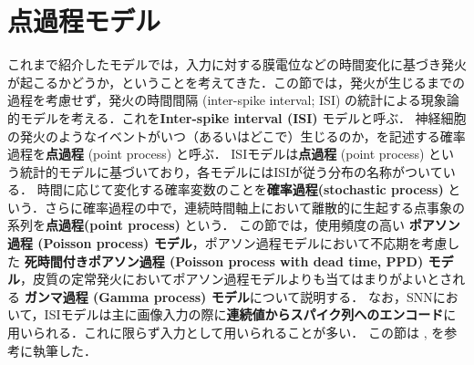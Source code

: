 \section{点過程モデル}
これまで紹介したモデルでは，入力に対する膜電位などの時間変化に基づき発火が起こるかどうか，ということを考えてきた．この節では，発火が生じるまでの過程を考慮せず，発火の時間間隔 (inter-spike interval; ISI) の統計による現象論的モデルを考える．これを\textbf{Inter-spike interval (ISI)} モデルと呼ぶ．
神経細胞の発火のようなイベントがいつ（あるいはどこで）生じるのか，を記述する確率過程を\textbf{点過程} (point process) と呼ぶ．
ISIモデルは\textbf{点過程} (point process) という統計的モデルに基づいており，各モデルにはISIが従う分布の名称がついている．
時間に応じて変化する確率変数のことを\textbf{確率過程(stochastic process)} という．さらに確率過程の中で，連続時間軸上において離散的に生起する点事象の系列を\textbf{点過程(point process)} という．
この節では，使用頻度の高い \textbf{ポアソン過程 (Poisson process) モデル}，ポアソン過程モデルにおいて不応期を考慮した \textbf{死時間付きポアソン過程 (Poisson process with dead time, PPD) モデル}，皮質の定常発火においてポアソン過程モデルよりも当てはまりがよいとされる \textbf{ガンマ過程 (Gamma process) モデル}について説明する．
なお，SNNにおいて，ISIモデルは主に画像入力の際に\textbf{連続値からスパイク列へのエンコード}に用いられる．これに限らず入力として用いられることが多い．
この節は \citep{Shimazaki_undated-ko}, \citep{Pachitariu2010-pm} を参考に執筆した．
